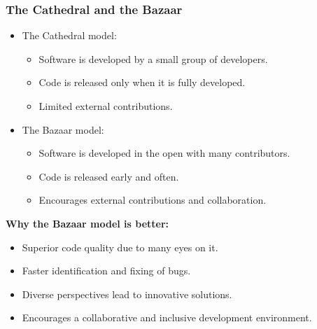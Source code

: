 \documentclass[aspectratio=169]{beamer} %
\begin{document}
\begin{frame}
  \frametitle{The Cathedral and the Bazaar}

  \begin{itemize}
    \item The Cathedral model:
      \begin{itemize}
        \item Software is developed by a small group of developers.
        \item Code is released only when it is fully developed.
        \item Limited external contributions.
      \end{itemize}
    \item The Bazaar model:
      \begin{itemize}
        \item Software is developed in the open with many contributors.
        \item Code is released early and often.
        \item Encourages external contributions and collaboration.
      \end{itemize}
  \end{itemize}

  \vspace{0.5cm}

  \textbf{Why the Bazaar model is better:}
  \begin{itemize}
    \item Superior code quality due to many eyes on it.
    \item Faster identification and fixing of bugs.
    \item Diverse perspectives lead to innovative solutions.
    \item Encourages a collaborative and inclusive development environment.
  \end{itemize}
\end{frame}
\end{document}
